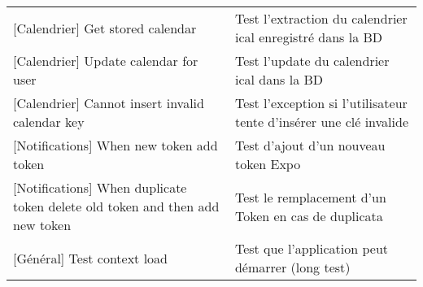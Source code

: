 \begin{tabular}{P{0.3\textwidth}P{0.6\textwidth}}
[Calendrier] Get stored calendar
&
Test l'extraction du calendrier ical enregistré dans la BD
\\%

[Calendrier] Update calendar for user
&
Test l'update du calendrier ical dans la BD
\\%

[Calendrier] Cannot insert invalid calendar key
&
Test l'exception si l'utilisateur tente d'insérer une clé invalide
\\%

[Notifications] When new token add token
&
Test d'ajout d'un nouveau token Expo
\\%

[Notifications] When duplicate token delete old token and then add new token
&
Test le remplacement d'un Token en cas de duplicata
\\%

[Général] Test context load
&
Test que l'application peut démarrer (long test)
\\
\hline
\end{tabular}